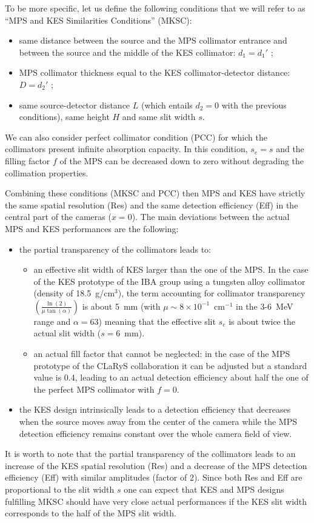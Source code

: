 \documentclass[a4paper,english,12pt]{article}
\newcommand{\qq}[1]{\enquote{#1}}
\begin{document}
To be more specific, let us define the following conditions that we will refer to as \qq{MPS and KES Similarities Conditions} (MKSC):
\begin{itemize}
	\item same distance between the source and the MPS collimator entrance and between the source and the middle of the KES collimator: $d_1=d_1'$ ;
	\item MPS collimator thickness equal to the KES collimator-detector distance: $D=d_2'$ ;
	\item same source-detector distance $L$ (which entails $d_2=0$ with the previous conditions), same height $H$ and same slit width $s$.	
\end{itemize}
We can also consider perfect collimator condition (PCC) for which the collimators present infinite absorption capacity. In this condition, $s_e=s$ and the filling factor $f$ of the MPS can be decreased down to zero without degrading the collimation properties.

Combining these conditions (MKSC and PCC) then MPS and KES have strictly the same spatial resolution (Res) and the same detection efficiency (Eff) in the central part of the cameras ($x=0$). The main deviations between the actual MPS and KES performances are the following: 
\begin{itemize}
	\item the partial transparency of the collimators leads to:
	\begin{itemize}
		\item an effective slit width of KES larger than the one of the MPS. In the case of the KES prototype of the IBA group using a tungsten alloy collimator (density of 18.5~g/cm$^3$), the term accounting for collimator transparency $\left(\frac{\ln(2)}{\mu \tan(\alpha)}\right)$ is about 5~mm (with $\mu\sim 8\times10^{-1}$~cm$^{-1}$ in the 3-6~MeV range and $\alpha=63$\textdegree) meaning that the effective slit $s_e$ is about twice the actual slit width ($s=6$~mm).
		\item an actual fill factor that cannot be neglected: in the case of the MPS prototype of the CLaRyS collaboration it can be adjusted but a standard value is 0.4, leading to an actual detection efficiency about half the one of the perfect MPS collimator with $f=0$. 
	\end{itemize}
	\item the KES design intrinsically leads to a detection efficiency that decreases when the source moves away from the center of the camera while the MPS detection efficiency remains constant over the whole camera field of view.
\end{itemize}
It is worth to note that the partial transparency of the collimators leads to an increase of the KES spatial resolution (Res) and a decrease of the MPS detection efficiency (Eff) with similar amplitudes (factor of 2). Since both Res and Eff are proportional to the slit width $s$ one can expect that KES and MPS designs fulfilling MKSC should have very close actual performances if the KES slit width corresponds to the half of the MPS slit width. 
\end{document}

